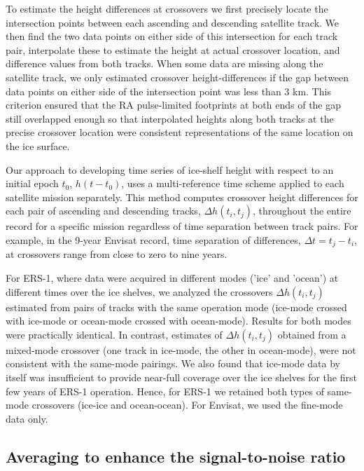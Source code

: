 \noindent
To estimate the height differences at crossovers we first precisely locate the intersection points between each ascending and descending satellite track. We then find the two data points on either side of this intersection for each track pair, interpolate these to estimate the height at actual crossover location, and difference values from both tracks. When some data are missing along the satellite track, we only estimated crossover height-differences if the gap between data points on either side of the intersection point was less than 3 km. This criterion ensured that the RA pulse-limited footprints at both ends of the gap still overlapped enough so that interpolated heights along both tracks at the precise crossover location were consistent representations of the same location on the ice surface.

Our approach to developing time series of ice-shelf height with respect to an initial epoch $t_0$, $h(t-t_0)$, uses a multi-reference time scheme \parencite{Khvorostovsky2012, Li2006} applied to each satellite mission separately. This method computes crossover height differences for each pair of ascending and descending tracks, $\Delta h(t_i,t_j)$, throughout the entire record for a specific mission regardless of time separation between track pairs. For example, in the 9-year Envisat record, time separation of differences, $\Delta t=t_j-t_i$, at crossovers range from close to zero to nine years. 

For ERS-1, where data were acquired in different modes ('ice' and 'ocean') at different times over the ice shelves, we analyzed the crossovers $\Delta h(t_i,t_j)$ estimated from pairs of tracks with the same operation mode (ice-mode crossed with ice-mode or ocean-mode crossed with ocean-mode). Results for both modes were practically identical. In contrast, estimates of $\Delta h(t_i,t_j)$ obtained from a mixed-mode crossover (one track in ice-mode, the other in ocean-mode), were not consistent with the same-mode pairings. We also found that ice-mode data by itself was insufficient to provide near-full coverage over the ice shelves for the first few years of ERS-1 operation. Hence, for ERS-1 we retained both types of same-mode crossovers (ice-ice and ocean-ocean). For Envisat, we used the fine-mode data only. 

\subsection{Averaging to enhance the signal-to-noise ratio}
\label{sec:ra-analysis}


